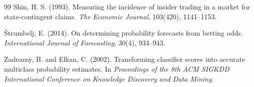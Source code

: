 \documentclass[11pt]{article}
\begin{document}
\begin{thebibliography}{99}
Shin, H. S. (1993).
Measuring the incidence of insider trading in a market for state-contingent
claims.
\emph{The Economic Journal}, 103(420), 1141--1153.

{\v S}trumbelj, E. (2014).
On determining probability forecasts from betting odds.
\emph{International Journal of Forecasting}, 30(4), 934--943.

Zadrozny, B. and Elkan, C. (2002).
Transforming classifier scores into accurate multiclass probability estimates.
In \emph{Proceedings of the 8th ACM SIGKDD International Conference on
Knowledge Discovery and Data Mining}.

\end{thebibliography}
\end{document}
